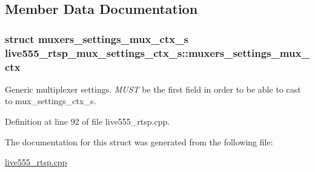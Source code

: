 \subsection{Member Data Documentation}
\subsubsection[{\texorpdfstring{muxers\+\_\+settings\+\_\+mux\+\_\+ctx}{muxers_settings_mux_ctx}}]{\setlength{\rightskip}{0pt plus 5cm}struct {\bf muxers\+\_\+settings\+\_\+mux\+\_\+ctx\+\_\+s} live555\+\_\+rtsp\+\_\+mux\+\_\+settings\+\_\+ctx\+\_\+s\+::muxers\+\_\+settings\+\_\+mux\+\_\+ctx}\hypertarget{structlive555__rtsp__mux__settings__ctx__s_ab882e923aec197102778eaa816fa940b}{}\label{structlive555__rtsp__mux__settings__ctx__s_ab882e923aec197102778eaa816fa940b}
Generic multiplexer settings. {\itshape M\+U\+ST} be the first field in order to be able to cast to mux\+\_\+settings\+\_\+ctx\+\_\+s. 

Definition at line 92 of file live555\+\_\+rtsp.\+cpp.



The documentation for this struct was generated from the following file\+:\begin{DoxyCompactItemize}
\item 
\hyperlink{live555__rtsp_8cpp}{live555\+\_\+rtsp.\+cpp}\end{DoxyCompactItemize}
